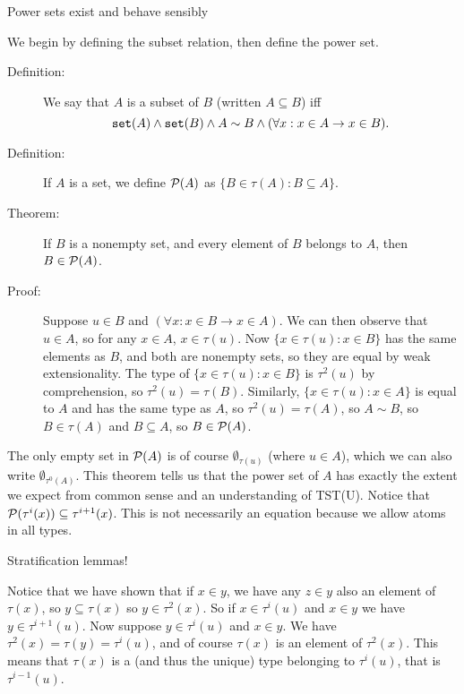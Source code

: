 \documentclass{slides}
\begin{document}
\begin{slide}

{\Large Power sets exist and behave sensibly}

We begin by defining the subset relation, then define the power set.

\begin{description}

\item[Definition:]  We say that $A$ is a subset of $B$ (written $A \subseteq B$) iff $${\tt set}(A) \wedge {\tt set}(B) \wedge A \sim B \wedge (\forall x:x \in A \rightarrow x \in B).$$

\item[Definition:]  If $A$ is a set, we define ${\cal P}(A)$ as $\{B \in \tau(A):B \subseteq A\}$.

\item[Theorem:]  If $B$ is a nonempty set, and every element of $B$ belongs to $A$, then $B \in {\cal P}(A)$.

\item[Proof:]  Suppose $u \in B$ and $(\forall x:x \in B \rightarrow x \in A)$.  We can then observe that $u \in A$, so for any $x \in A$, $x \in \tau(u)$.  Now
\newline $\{x \in \tau(u):x \in B\}$ has the same elements as $B$, and both are nonempty sets, so they are equal by weak extensionality.  The type of $\{x \in \tau(u):x \in B\}$ is $\tau^2(u)$
by comprehension, so $\tau^2(u) = \tau(B)$.  Similarly, $\{x \in \tau(u):x \in A\}$ is equal to $A$ and has the same type as $A$, so $\tau^2(u) = \tau(A)$, so $A \sim B$, so $B \in \tau(A)$ and $B \subseteq A$, so $B \in {\cal P}(A)$.

\end{description}

The only empty set in ${\cal P}(A)$ is of course $\emptyset_{\tau(u)}$ (where $u \in A$), which we can also write $\emptyset_{\tau^0(A)}$.  This theorem tells us that the power set
of $A$ has exactly the extent we expect from common sense and an understanding of TST(U).  Notice that ${\cal P}(\tau^i(x)) \subseteq \tau^{i+1}(x)$.  This is not necessarily an equation because we allow atoms in all types.

\end{slide}

\begin{slide}

{\Large Stratification lemmas!}

Notice that we have shown that if $x \in y$, we have any $z \in y$ also an element of $\tau(x)$, so $y \subseteq \tau(x)$ so $y \in \tau^2(x)$.  So if $x \in \tau^i(u)$ and $x \in y$ we have $y \in \tau^{i+1}(u)$.
Now suppose $y \in \tau^i(u)$ and $x \in y$.  We have $\tau^2(x) = \tau(y) = \tau^i(u)$, and of course $\tau(x)$ is an element of $\tau^2(x)$.  This means that $\tau(x)$ is a (and thus the unique) type belonging to $\tau^i(u)$, that is $\tau^{i-1}(u)$.

\end{slide}
\end{document}
